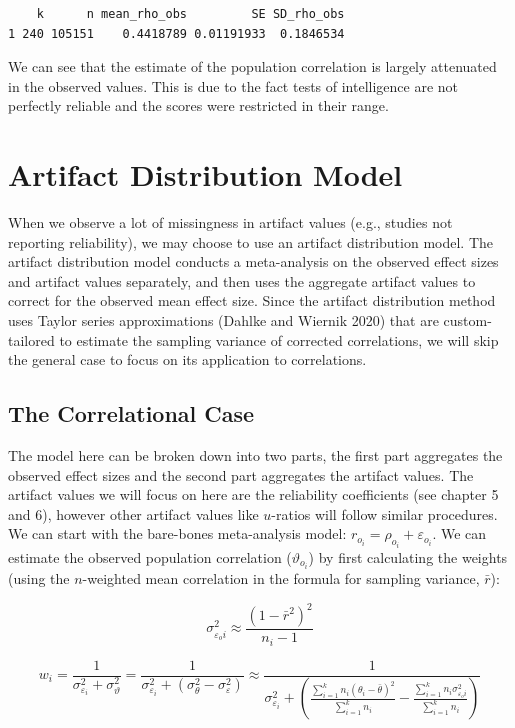 \documentclass[
  letterpaper,
  DIV=11,
  numbers=noendperiod]{scrreprt}
\begin{document}
\begin{verbatim}
    k      n mean_rho_obs         SE SD_rho_obs
1 240 105151    0.4418789 0.01191933  0.1846534
\end{verbatim}

We can see that the estimate of the population correlation is largely
attenuated in the observed values. This is due to the fact tests of
intelligence are not perfectly reliable and the scores were restricted
in their range.

\section{Artifact Distribution Model}\label{artifact-distribution-model}

When we observe a lot of missingness in artifact values (e.g., studies
not reporting reliability), we may choose to use an artifact
distribution model. The artifact distribution model conducts a
meta-analysis on the observed effect sizes and artifact values
separately, and then uses the aggregate artifact values to correct for
the observed mean effect size. Since the artifact distribution method
uses Taylor series approximations (Dahlke and Wiernik 2020) that are
custom-tailored to estimate the sampling variance of corrected
correlations, we will skip the general case to focus on its application
to correlations.

\subsection{The Correlational Case}\label{the-correlational-case}

The model here can be broken down into two parts, the first part
aggregates the observed effect sizes and the second part aggregates the
artifact values. The artifact values we will focus on here are the
reliability coefficients (see chapter 5 and 6), however other artifact
values like \(u\)-ratios will follow similar procedures. We can start
with the bare-bones meta-analysis model:
\(r_{o_i} = \rho_{o_i} + \varepsilon_{o_i}\). We can estimate the
observed population correlation (\(\vartheta_{o_i}\)) by first
calculating the weights (using the \(n\)-weighted mean correlation in
the formula for sampling variance, \(\bar{r}\)):

\[
\sigma^2_{\varepsilon_oi} \approx \frac{(1-\bar{r}^2)^2}{n_i-1} 
\]

\[
w_i = \frac{1}{\sigma^2_{\varepsilon_i}+\sigma_\vartheta^2} = \frac{1}{\sigma^2_{\varepsilon_i}+(\sigma^2_{\theta}-\sigma^2_{\varepsilon})} \approx \frac{1}{\sigma^2_{\varepsilon_i}+\left(\frac{\sum^k_{i=1}n_i(\theta_i - \bar{\theta})^2}{\sum^k_{i=1}n_i}-\frac{\sum^k_{i=1}n_i\sigma^2_{\varepsilon_oi}}{\sum^k_{i=1}n_i}\right)}
\]
\end{document}
